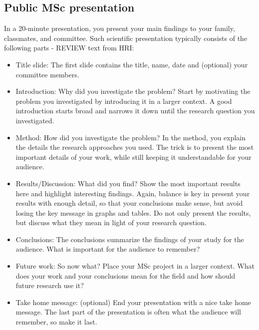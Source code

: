 \subsection{Public MSc presentation}

In a 20-minute presentation, you present your main findings to your family, classmates, and committee. Such scientific presentation typically consists of the following parts - REVIEW text from HRI:

\begin{itemize}
    \item Title slide: The first slide contains the title, name, date and (optional) your committee members.
    
    \item Introduction: Why did you investigate the problem?
Start by motivating the problem you investigated by introducing it in a larger context. A good introduction starts broad and narrows it down until the research question you investigated.

    \item Method: How did you investigate the problem?
In the method, you explain the details the research approaches you used. The trick is to present the most important details of your work, while still keeping it understandable for your audience.
    \item Results/Discussion: What did you find?
Show the most important results here and highlight interesting findings. Again, balance is key in present your results with enough detail, so that your conclusions make sense, but avoid losing the key message in graphs and tables. Do not only present the results, but discuss what they mean in light of your research question.

    \item Conclusions: The conclusions summarize the findings of your study for the audience. What is important for the audience to remember?
    
    \item Future work: So now what?
Place your MSc project in a larger context. What does your work and your conclusions mean for the field and how should future research use it?

    \item Take home message: (optional) End your presentation with a nice take home message. The last part of the presentation is often what the audience will remember, so make it last.

\end{itemize}

